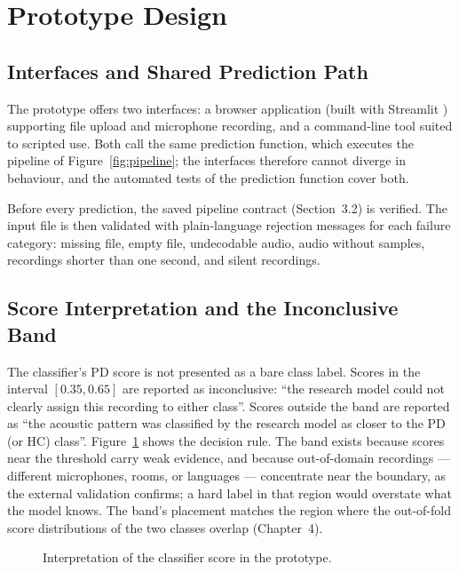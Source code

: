 \section{Prototype Design}

\subsection{Interfaces and Shared Prediction Path}

The prototype offers two interfaces: a browser application (built with
Streamlit \cite{streamlit}) supporting file upload and microphone
recording, and a command-line tool suited to scripted use. Both call
the same prediction function, which executes the pipeline of
Figure~\ref{fig:pipeline}; the interfaces therefore cannot diverge in
behaviour, and the automated tests of the prediction function cover
both.

Before every prediction, the saved pipeline contract
(Section~3.2) is verified. The input file is then validated with
plain-language rejection messages for each failure category: missing
file, empty file, undecodable audio, audio without samples, recordings
shorter than one second, and silent recordings.

\subsection{Score Interpretation and the Inconclusive Band}

The classifier's PD score is not presented as a bare class label.
Scores in the interval $[0.35, 0.65]$ are reported as inconclusive:
``the research model could not clearly assign this recording to either
class''. Scores outside the band are reported as ``the acoustic
pattern was classified by the research model as closer to the PD (or
HC) class''. Figure~\ref{fig:band} shows the decision rule. The band
exists because scores near the threshold carry weak evidence, and
because out-of-domain recordings --- different microphones, rooms, or
languages --- concentrate near the boundary, as the external
validation confirms; a hard label in that region would overstate what
the model knows. The band's placement matches the region where the
out-of-fold score distributions of the two classes overlap
(Chapter~4).

\begin{figure}[htb]
\centering
{}
\caption{Interpretation of the classifier score in the prototype.}
\label{fig:band}
\end{figure}

